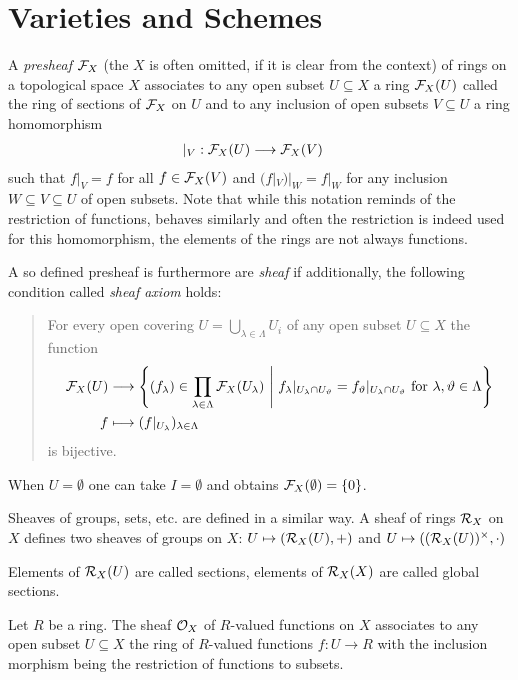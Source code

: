 \documentclass[a4paper,parskip=full,numbers=enddot]{scrreprt}
\begin{document}
\chapter{Varieties and Schemes}
\begin{defi}
    A \emph{presheaf} $\mathcal{F}_X$ (the $X$ is often omitted, if it is clear from the context) of rings on a topological space $X$ associates to any open subset $U\subseteq X$ a ring $\mathcal{F}_X(U)$ called the ring of sections of $\mathcal{F}_X$ on $U$ and to any inclusion of open subsets $V\subseteq U$ a ring homomorphism 
    \begin{align*}
        |_V: \mathcal{F}_X(U) &\longrightarrow \mathcal{F}_X(V)
    \end{align*}
    such that $f|_V = f$ for all $f\in\mathcal{F}_X(V)$ and $(f|_V)|_W = f|_W$ for any inclusion $W\subseteq V\subseteq U$ of open subsets. Note that while this notation reminds of the restriction of functions, behaves similarly and often the restriction is indeed used for this homomorphism, the elements of the rings are not always functions. 
    
    A so defined presheaf is furthermore are \emph{sheaf} if additionally, the following condition called \emph{sheaf axiom} holds:
    \begin{quote}
     For every open covering $U = \bigcup_{\lambda\in \Lambda} U_i$ of any open subset $U\subseteq X$ the function
        \begin{align*}\lbl{eq:sheafAxiom}
			\Ff_X(U) &\longto \left\{(f_\lambda)\in \prod_{\lambda\in\Lambda} \Ff_X (U_\lambda)\st f_\lambda|_{U_\lambda\cap U_\vartheta} = f_\vartheta|_{U_\lambda\cap U_\vartheta} \text{ for }\lambda,\vartheta\in \Lambda\right\}\\
			f &\longmapsto (f|_{U_\lambda})_{\lambda\in\Lambda}
        \end{align*}
        is bijective.
    \end{quote}
\begin{rem}
    When $U=\emptyset$ one can take $I=\emptyset$ and obtains $\mathcal{F}_X(\emptyset) = \{0\}$.
\end{rem}
\begin{rem}
    Sheaves of groups, sets, etc. are defined in a similar way. A sheaf of rings $\mathcal{R}_X$ on $X$ defines two sheaves of groups on $X$: $U\mapsto (\mathcal{R}_X(U), +)$ and $U\mapsto ((\mathcal{R}_X(U))^\times, \cdot)$
\end{rem}
\begin{rem}
    Elements of $\mathcal{R}_X(U)$ are called sections, elements of $\mathcal{R}_X(X)$ are called global sections.
\end{rem}
\begin{example}
    Let $R$ be a ring. The sheaf $\mathcal{O}_X$ of $R$-valued functions on $X$ associates to any open subset $U\subseteq X$ the ring of $R$-valued functions $f: U \to R$ with the inclusion morphism being the restriction of functions to subsets.
\end{example}


\end{defi}
\end{document}
